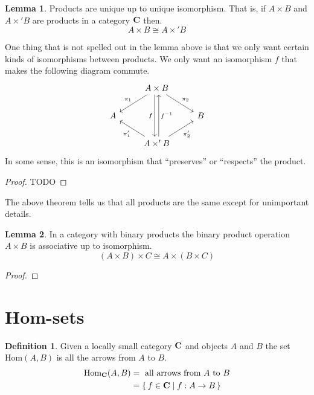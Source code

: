 \documentclass{book}
\theoremstyle{definition}
\newtheorem{definition}{Definition}[section]
\newtheorem{lemma}{Lemma}
\newcommand\Hom{\text{Hom}}
\begin{document}
\begin{lemma}
  Products are unique up to unique isomorphism. That is, if $A \times B$ and $A \times'
  B$ are products in a category $\bf{C}$ then.
  $$
  A \times B \cong A \times' B
  $$
\end{lemma}
One thing that is not spelled out in the lemma above is that we only want certain kinds of isomorphisms between products.
We only want an isomorphism $f$ that makes the following diagram commute.
\[
\begin{tikzcd}
  & A \times B \arrow[ld, "\pi_1"'] \arrow[rd, "\pi_2"] \arrow[dd, "f"', shift right]        &   \\
A &                                                                                & B \\
  & A \times' B \arrow[ru, "\pi'_2"'] \arrow[lu, "\pi'_1"] \arrow[uu, "f^{-1}"', shift right] &
\end{tikzcd}
\]
In some sense, this is an isomorphism that ``preserves'' or ``respects'' the product.
\begin{proof}
  TODO
\end{proof}

The above theorem tells us that all products are the same except for unimportant
details.

\begin{lemma}
  In a category with binary products the binary product operation $A \times B$
  is associative up to isomorphism.
  \[
    (A \times B) \times C \cong A \times (B \times C)
  \]
\end{lemma}
\begin{proof}

\end{proof}

\section{Hom-sets}

\begin{definition}
  Given a locally small category $\bf{C}$ and objects $A$ and $B$ the set
  $\Hom(A, B)$ is all the arrows from $A$ to $B$.
  \begin{align*}
    \Hom_{\mathbf{C}}(A, B) &= \text{ all arrows from } A \text{ to } B \\
                          &= \set{ f \in \mathbf{C} \mid f : A \rightarrow B }
  \end{align*}
\end{definition}
\end{document}
